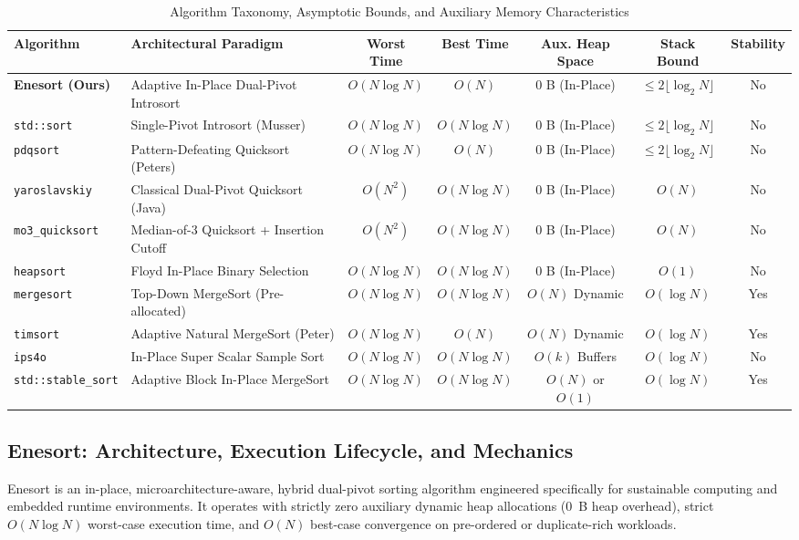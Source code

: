 \documentclass[journal]{IEEEtran}
\begin{document}
\begin{table}[t]
\centering
\caption{Algorithm Taxonomy, Asymptotic Bounds, and Auxiliary Memory Characteristics}
\label{tab:algorithm_taxonomy}
\begin{tabular}{llccccc}
\toprule
Algorithm & Architectural Paradigm & Worst Time & Best Time & Aux. Heap Space & Stack Bound & Stability \\
\midrule
\textbf{Enesort (Ours)} & Adaptive In-Place Dual-Pivot Introsort & $O(N \log N)$ & $O(N)$ & 0 B (In-Place) & $\le 2 \lfloor \log_2 N \rfloor$ & No \\
\texttt{std::sort} & Single-Pivot Introsort (Musser) & $O(N \log N)$ & $O(N \log N)$ & 0 B (In-Place) & $\le 2 \lfloor \log_2 N \rfloor$ & No \\
\texttt{pdqsort} & Pattern-Defeating Quicksort (Peters) & $O(N \log N)$ & $O(N)$ & 0 B (In-Place) & $\le 2 \lfloor \log_2 N \rfloor$ & No \\
\texttt{yaroslavskiy} & Classical Dual-Pivot Quicksort (Java) & $O(N^2)$ & $O(N \log N)$ & 0 B (In-Place) & $O(N)$ & No \\
\texttt{mo3\_quicksort} & Median-of-3 Quicksort + Insertion Cutoff & $O(N^2)$ & $O(N \log N)$ & 0 B (In-Place) & $O(N)$ & No \\
\texttt{heapsort} & Floyd In-Place Binary Selection & $O(N \log N)$ & $O(N \log N)$ & 0 B (In-Place) & $O(1)$ & No \\
\texttt{mergesort} & Top-Down MergeSort (Pre-allocated) & $O(N \log N)$ & $O(N \log N)$ & $O(N)$ Dynamic & $O(\log N)$ & Yes \\
\texttt{timsort} & Adaptive Natural MergeSort (Peter) & $O(N \log N)$ & $O(N)$ & $O(N)$ Dynamic & $O(\log N)$ & Yes \\
\texttt{ips4o} & In-Place Super Scalar Sample Sort & $O(N \log N)$ & $O(N \log N)$ & $O(k)$ Buffers & $O(\log N)$ & No \\
\texttt{std::stable\_sort} & Adaptive Block In-Place MergeSort & $O(N \log N)$ & $O(N \log N)$ & $O(N)$ or $O(1)$ & $O(\log N)$ & Yes \\
\bottomrule
\end{tabular}
\end{table}

\subsection{Enesort: Architecture, Execution Lifecycle, and Mechanics}
Enesort is an in-place, microarchitecture-aware, hybrid dual-pivot sorting algorithm engineered specifically for sustainable computing and embedded runtime environments. It operates with strictly zero auxiliary dynamic heap allocations ($0$~B heap overhead), strict $O(N \log N)$ worst-case execution time, and $O(N)$ best-case convergence on pre-ordered or duplicate-rich workloads.
\end{document}
